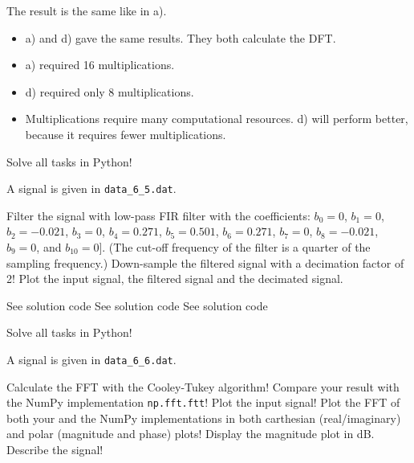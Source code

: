 \begin{solution}
\begin{tasks}
		The result is the same like in a).
		
		\task
		\begin{itemize}
			\item a) and d) gave the same results. They both calculate the DFT.
			\item a) required 16 multiplications.
			\item d) required only 8 multiplications.
			\item Multiplications require many computational resources. d) will perform better, because it requires fewer multiplications.
		\end{itemize}
		
	\end{tasks}
\end{solution}


\begin{question}[subtitle={Python Programming: Digital Signal Processing}]
	Solve all tasks in Python!
	
	A signal is given in \texttt{data\_6\_5.dat}.
	
	\begin{tasks}
		\task
		Filter the signal with low-pass FIR filter with the coefficients: $b_0 = 0$, $b_1 = 0$, $b_2 = -0.021$, $b_3 = 0$, $b_4 = 0.271$, $b_5 = 0.501$, $b_6 = 0.271$, $b_7 = 0$, $b_8 = -0.021$, $b_9 = 0$, and $b_{10} = 0]$. (The cut-off frequency of the filter is a quarter of the sampling frequency.)
		\task
		Down-sample the filtered signal with a decimation factor of 2!
		\task
		Plot the input signal, the filtered signal and the decimated signal.
	\end{tasks}
\end{question}

\begin{solution}
	\begin{tasks}
		\task
		See solution code
		\task
		See solution code
		\task
		See solution code
	\end{tasks}
\end{solution}


\begin{question}[subtitle={Python Programming: FFT}]
	Solve all tasks in Python!
	
	A signal is given in \texttt{data\_6\_6.dat}.
	
	\begin{tasks}
		\task
		Calculate the FFT with the Cooley-Tukey algorithm!
		\task
		Compare your result with the NumPy implementation \texttt{np.fft.ftt}!
		\task
		Plot the input signal! Plot the FFT of both your and the NumPy implementations in both carthesian (real/imaginary) and polar (magnitude and phase) plots! Display the magnitude plot in \si{dB}.
		\task
		Describe the signal!
	\end{tasks}
\end{question}

